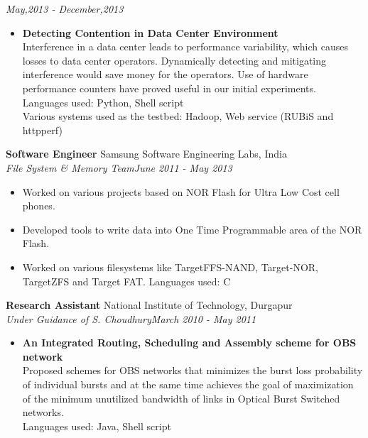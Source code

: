 \documentclass[margin,line]{res}
\begin{document}
\begin{resume}
\hspace{10cm} \hfill {\it May,2013 - December,2013}
\begin{itemize}
	\item \textbf{Detecting Contention in Data Center Environment}\\
	Interference in a data center leads to performance variability, which causes losses to data center operators. Dynamically detecting and mitigating interference
	would save money for the operators. Use of hardware performance counters have proved useful in our initial experiments.\\
	Languages used: Python, Shell script \\
	Various systems used as the testbed: Hadoop, Web service (RUBiS and httpperf)\\
\end{itemize}	
\textbf{Software Engineer} \hfill Samsung Software Engineering Labs, India \\ 
\textit{File System \& Memory Team}\hfill {\it June 2011 - May 2013}
	\begin{itemize}
		\setlength{\itemsep}{-10pt}
		\item Worked on various projects based on NOR Flash for Ultra Low Cost cell phones.\\
		\item Developed tools to write data into One Time Programmable area of the NOR Flash.\\
		\item Worked on various filesystems like TargetFFS-NAND, Target-NOR, TargetZFS and Target FAT.
		Languages used: C\\
	\end{itemize}
			
\textbf{Research Assistant} \hfill National Institute of Technology, Durgapur \\ 
\textit{Under Guidance of S. Choudhury}\hfill {\it March 2010 - May 2011}
	\begin{itemize}
		\item \textbf{An Integrated Routing, Scheduling and Assembly scheme for OBS network}\\
		Proposed schemes for OBS networks that minimizes the burst loss probability of individual bursts and at the same time achieves the goal of maximization of the minimum unutilized bandwidth of links in Optical Burst Switched networks.\\
		Languages used: Java, Shell script\\
	\end{itemize}		
	

\end{resume}
\end{document}

